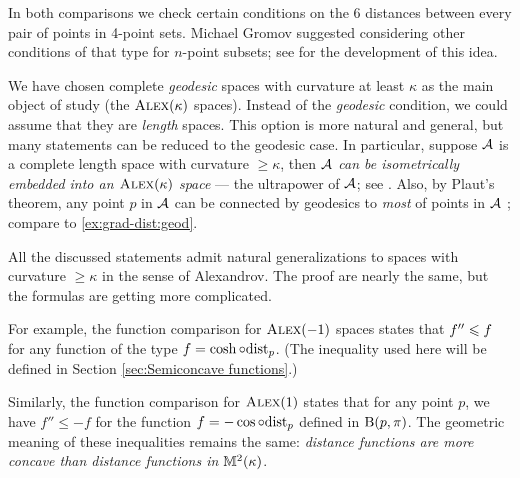 In both comparisons we check certain conditions on the 6 distances between every pair of points in 4-point sets.
Michael Gromov \cite[Section 1.19$_+$]{gromov1999} suggested considering other conditions of that type for $n$-point subsets;
see \cite{toyoda,lebedeva-petrunin-zolotov,lebedeva2019,petrunin2017,lebedeva-petrunin2024,lebedeva-petrunin2023,lebedeva-petrunin2021,lebedeva-petrunin2025,eskenazis-mendel-naor,gromov2001} for the development of this idea.

We have chosen complete \textit{geodesic} spaces with curvature at least $\kappa$ as the main object of study (the $\textsc{Alex}(\kappa)$ spaces).
Instead of the \textit{geodesic} condition, we could assume that they are \textit{length} spaces. 
This option is more natural and general, but many statements can be reduced to the geodesic case.
In particular, suppose $\mathcal{A}$ is a complete length space with curvature $\ge \kappa$,
then 
\textit{$\mathcal{A}$ can be isometrically embedded into an $\textsc{Alex}(\kappa)$ space} --- the ultrapower of $\mathcal{A}$; see \cite[4.11+8.4]{alexander-kapovitch-petrunin2024}.
Also, by Plaut's theorem, any point $p$ in $\mathcal{A}$ can be connected by geodesics to \textit{most} of points in $\mathcal{A}$
\cite[8.11]{alexander-kapovitch-petrunin2024}; compare to \ref{ex:grad-dist:geod}.

All the discussed statements admit natural generalizations to 
spaces with curvature $\ge \kappa$ in the sense of Alexandrov.
The proof are nearly the same, but the formulas are getting more complicated.

For example, the function comparison for $\textsc{Alex}(-1)$ spaces states that 
$f''\leqslant f$ for any function of the type $f=\cosh\circ\mathrm{dist}_p$.
(The inequality used here will be defined in Section \ref{sec:Semiconcave functions}.)

Similarly, the function comparison for $\textsc{Alex}(1)$ states that for any point $p$, we have
$f''\le -f$ for the function $f=-\cos\circ\mathrm{dist}_p$
defined in $\mathrm{B}{}(p,\pi)$.
The geometric meaning of these inequalities remains the same:
\textit{distance functions are more concave than distance functions in $\mathbb{M}^2(\kappa)$}.
